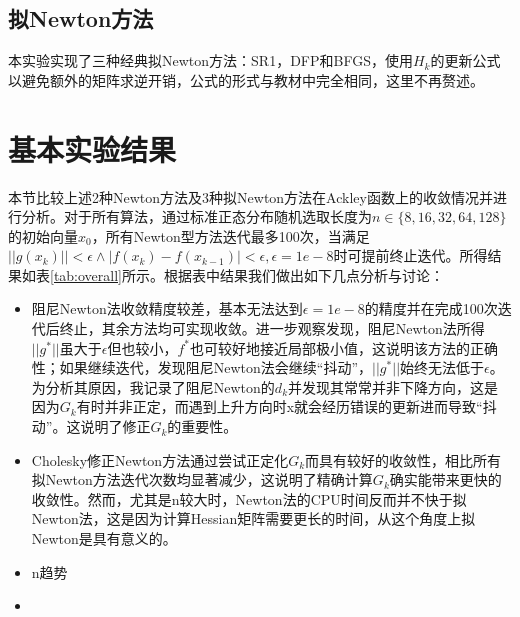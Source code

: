 \documentclass{article}
\begin{document}
\subsection{拟Newton方法}
本实验实现了三种经典拟Newton方法：SR1，DFP和BFGS，使用$H_k$的更新公式以避免额外的矩阵求逆开销，公式的形式与教材中完全相同，这里不再赘述。

\section{基本实验结果}
本节比较上述2种Newton方法及3种拟Newton方法在Ackley函数上的收敛情况并进行分析。对于所有算法，通过标准正态分布随机选取长度为$n\in \{ 8, 16, 32, 64, 128 \}$的初始向量$x_0$，所有Newton型方法迭代最多100次，当满足$||g(x_k)|| < \epsilon \wedge |f(x_{k}) - f(x_{k-1})| < \epsilon, \epsilon=1e-8$时可提前终止迭代。所得结果如表\ref{tab:overall}所示。根据表中结果我们做出如下几点分析与讨论：
\begin{itemize}
  \item 阻尼Newton法收敛精度较差，基本无法达到$\epsilon=1e-8$的精度并在完成100次迭代后终止，其余方法均可实现收敛。进一步观察发现，阻尼Newton法所得$||g^*||$虽大于$\epsilon$但也较小，$f^*$也可较好地接近局部极小值，这说明该方法的正确性；如果继续迭代，发现阻尼Newton法会继续“抖动”，$||g^*||$始终无法低于$\epsilon$。为分析其原因，我记录了阻尼Newton的$d_k$并发现其常常并非下降方向，这是因为$G_k$有时并非正定，而遇到上升方向时x就会经历错误的更新进而导致“抖动”。这说明了修正$G_k$的重要性。
  \item Cholesky修正Newton方法通过尝试正定化$G_k$而具有较好的收敛性，相比所有拟Newton方法迭代次数均显著减少，这说明了精确计算$G_k$确实能带来更快的收敛性。然而，尤其是n较大时，Newton法的CPU时间反而并不快于拟Newton法，这是因为计算Hessian矩阵需要更长的时间，从这个角度上拟Newton是具有意义的。
  \item n趋势
  \item 
\end{itemize}
\end{document}
